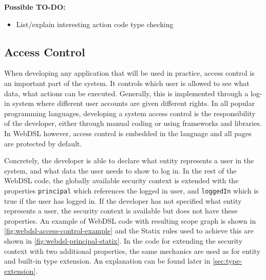       \textbf{Possible TO-DO:}
      \begin{itemize}
        \item List/explain interesting action code type checking
      \end{itemize}

    \subsection{\label{subsec:access-control}Access Control}

      When developing any application that will be used in practice, access control is an important part of the system. It controls which user is allowed to see what data, what actions can be executed. Generally, this is implemented through a log-in system where different user accounts are given different rights. In all popular programming languages, developing a system access control is the responsibility of the developer, either through manual coding or using frameworks and libraries. In WebDSL however, access control is embedded in the language and all pages are protected by default.

      Concretely, the developer is able to declare what entity represents a user in the system, and what data the user needs to show to log in. In the rest of the WebDSL code, the globally available security context is extended with the properties \texttt{principal} which references the logged in user, and \texttt{loggedIn} which is true if the user has logged in. If the developer has not specified what entity represents a user, the security context is available but does not have these properties. An example of WebDSL code with resulting scope graph is shown in \cref{fig:webdsl-access-control-example} and the Statix rules used to achieve this are shown in \cref{fig:webdsl-principal-statix}. In the code for extending the security context with two additional properties, the same mechanics are used as for entity and built-in type extension. An explanation can be found later in \cref{sec:type-extension}.

